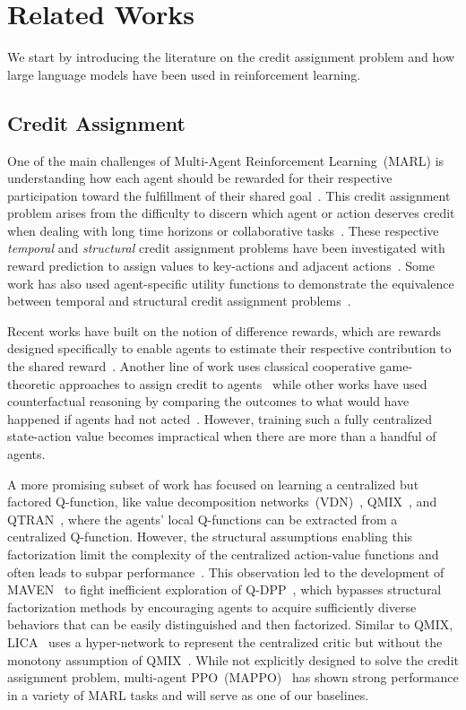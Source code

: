 \section{Related Works}
We start by introducing the literature on the credit assignment problem and how large language models have been used in reinforcement learning.


\subsection{Credit Assignment}
One of the main challenges of Multi-Agent Reinforcement Learning~(MARL) is understanding how each agent should be rewarded for their respective participation toward the fulfillment of their shared goal~\cite{weiss1995distributed}. This credit assignment problem arises from the difficulty to discern which agent or action deserves credit when dealing with long time horizons or collaborative tasks~\cite{Sammut2010}. These respective \emph{temporal} and \emph{structural} credit assignment problems have been investigated with reward prediction to assign values to key-actions and adjacent actions~\cite{seo2019rewards}. Some work has also used agent-specific utility functions to demonstrate the equivalence between temporal and structural credit assignment problems~\cite{agogino2004unifying}.

Recent works have built on the notion of difference rewards, which are rewards designed specifically to enable agents to estimate their respective contribution to the shared reward~\cite{nguyen2018credit, feng2022multi, singh2021credit}. Another line of work uses classical cooperative game-theoretic approaches to assign credit to agents~\cite{han2022multiagent, wang2020shapley} while other works have used counterfactual reasoning by comparing the outcomes to what would have happened if agents had not acted~\cite{rahmattalabi2016d++, foerster2018counterfactual}. However, training such a fully centralized state-action value becomes impractical when there are more than a handful of agents.

A more promising subset of work has focused on learning a centralized but factored Q-function, like value decomposition networks~(VDN)~\cite{sunehag2018VDN}, QMIX~\cite{rashid2020monotonic}, and QTRAN~\cite{son2019qtran}, where the agents' local Q-functions can be extracted from a centralized Q-function. However, the structural assumptions enabling this factorization limit the complexity of the centralized action-value functions and often leads to subpar performance~\cite{mahajan2019maven}. This observation led to the development of MAVEN~\cite{mahajan2019maven} to fight inefficient exploration of Q-DPP~\cite{yang2020QDPP}, which bypasses structural factorization methods by encouraging agents to acquire sufficiently diverse behaviors that can be easily distinguished and then factorized. Similar to QMIX, LICA~\cite{zhou2020learning} uses a hyper-network to represent the centralized critic but without the monotony assumption of QMIX~\cite{rashid2020monotonic}. While not explicitly designed to solve the credit assignment problem, multi-agent PPO~(MAPPO)~\cite{yu2022surprising} has shown strong performance in a variety of MARL tasks and will serve as one of our baselines.


